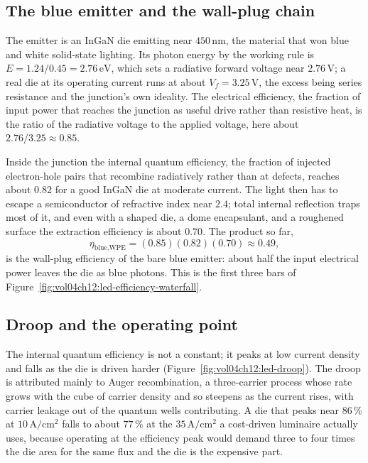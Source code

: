 

\subsection{The blue emitter and the wall-plug chain}

The emitter is an InGaN die emitting near $450\,\si{\nano\meter}$, the
material that won blue and white solid-state lighting. Its photon energy
by the working rule is $E = 1.24/0.45 = 2.76\,\si{\electronvolt}$, which
sets a radiative forward voltage near $2.76\,\si{\volt}$; a real die at
its operating current runs at about $V_{f} = 3.25\,\si{\volt}$, the
excess being series resistance and the junction's own ideality. The
electrical efficiency, the fraction of input power that reaches the
junction as useful drive rather than resistive heat, is the ratio of the
radiative voltage to the applied voltage, here about
$2.76/3.25 \approx 0.85$.

Inside the junction the internal quantum efficiency, the fraction of
injected electron-hole pairs that recombine radiatively rather than at
defects, reaches about $0.82$ for a good InGaN die at moderate current.
The light then has to escape a semiconductor of refractive index near
$2.4$; total internal reflection traps most of it, and even with a
shaped die, a dome encapsulant, and a roughened surface the extraction
efficiency is about $0.70$. The product so far,
\[
\eta_{\text{blue,WPE}}
= (0.85)(0.82)(0.70) \approx 0.49,
\]
is the wall-plug efficiency of the bare blue emitter: about half the
input electrical power leaves the die as blue photons. This is the first
three bars of Figure~\ref{fig:vol04ch12:led-efficiency-waterfall}.

\subsection{Droop and the operating point}

The internal quantum efficiency is not a constant; it peaks at low
current density and falls as the die is driven harder
(Figure~\ref{fig:vol04ch12:led-droop}). The droop is attributed mainly
to Auger recombination, a three-carrier process whose rate grows with
the cube of carrier density and so steepens as the current rises, with
carrier leakage out of the quantum wells contributing. A die that peaks
near $86\,\%$ at $10\,\si{\ampere\per\centi\meter\squared}$ falls to about
$77\,\%$ at the $35\,\si{\ampere\per\centi\meter\squared}$ a cost-driven
luminaire actually uses, because operating at the efficiency peak would
demand three to four times the die area for the same flux and the die is
the expensive part.

